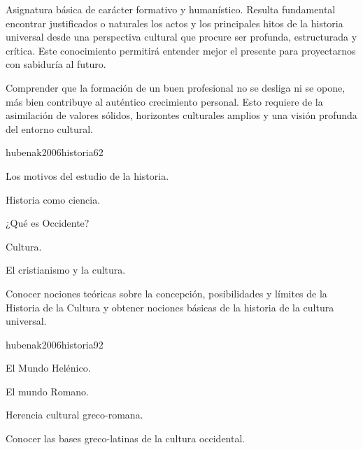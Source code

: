 \begin{syllabus}


\begin{justification}
Asignatura básica de carácter formativo y humanístico. Resulta fundamental encontrar justificados o naturales los actos y los principales hitos de la historia universal desde una perspectiva cultural que procure ser profunda, estructurada y crítica. Este conocimiento permitirá entender mejor el presente para proyectarnos con sabiduría al futuro.
\end{justification}

\begin{goals}
\item Comprender que la formación de un buen profesional no se desliga ni se opone, más bien contribuye al auténtico crecimiento personal. Esto requiere de la asimilación de valores sólidos, horizontes culturales amplios y una visión profunda del entorno cultural.
\end{goals}

\begin{outcomes}
\end{outcomes}

\begin{unit}{}{hubenak2006historia}{6}{2}
\begin{topics}
	\item Los motivos del estudio de la historia. 	
	\item Historia como ciencia. 	
	\item ¿Qué es Occidente? 	
	\item Cultura. 	
	\item El cristianismo y la cultura. 
\end{topics}
\begin{unitgoals}
	\item Conocer nociones teóricas sobre la concepción, posibilidades y límites de la Historia de la Cultura y obtener nociones básicas de la historia de la cultura universal.
\end{unitgoals}
\end{unit}

\begin{unit}{}{hubenak2006historia}{9}{2}
\begin{topics}
	\item El Mundo Helénico. 	
	\item El mundo Romano. 	
	\item Herencia cultural greco-romana. 
\end{topics}
\begin{unitgoals}
	\item Conocer las bases greco-latinas de la cultura occidental.
\end{unitgoals}
\end{unit}


\end{syllabus}

